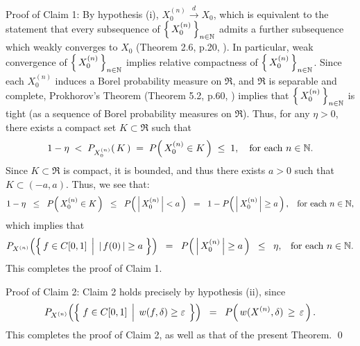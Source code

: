 \vskip 0.3cm
\noindent
Proof of Claim 1:\quad
By hypothesis (i), $X^{(n)}_{0} \overset{d}{\longrightarrow} X_{0}$, which is equivalent to
the statement that every subsequence of $\left\{\,X^{(n)}_{0}\,\right\}_{n\in\mathbb{N}}$ admits a further
subsequence which weakly converges to $X_{0}$ (Theorem 2.6, p.20, \cite{Billingsley1999}).
In particular, weak convergence of $\left\{\,X^{(n)}_{0}\,\right\}_{n\in\mathbb{N}}$ implies relative
compactness of $\left\{\,X^{(n)}_{0}\,\right\}_{n\in\mathbb{N}}$.
Since each $X^{(n)}_{0}$ induces a Borel probability measure on $\Re$, and $\Re$ is separable and complete,
Prokhorov's Theorem (Theorem 5.2, p.60, \cite{Billingsley1999}) implies that $\left\{\,X^{(n)}_{0}\,\right\}_{n\in\mathbb{N}}$
is tight (as a sequence of Borel probability measures on $\Re$).
Thus, for any $\eta > 0$, there exists a compact set $K \subset \Re$ such that
\begin{equation*}
1 - \eta \;<\; P_{X^{(n)}_{0}}\!\left(\,K\,\right) \;=\; P\!\left(\,X^{(n)}_{0} \in K\,\right) \;\leq\; 1,
\quad\textnormal{for each $n \in \mathbb{N}$}.
\end{equation*}
Since $K \subset \Re$ is compact, it is bounded, and thus there exists $a > 0$ such that
$K \subset (-a,a)$. Thus, we see that:
\begin{equation*}
1 - \eta
\;\;\leq\;\; P\!\left(\,X^{(n)}_{0} \in K\,\right)
\;\;\leq\;\; P\!\left(\, \left\vert\,X^{(n)}_{0}\,\right\vert \overset{{\color{white}.}}{<} a \,\right)
\;\; = \;\; 1 - P\!\left(\, \left\vert\,X^{(n)}_{0}\,\right\vert \overset{{\color{white}.}}{\geq} a \,\right),
\;\;\;\textnormal{for each $n \in \N$},
\end{equation*}
which implies that
\begin{equation*}
P_{X^{(n)}}\!\left(\left\{\,f \in \Czo \;\left\vert\;\, \vert\,f(0)\,\vert \overset{{\color{white}.}}{\geq} a \right.\,\right\}\right)
\;\; = \;\; P\!\left(\, \left\vert\,X^{(n)}_{0}\,\right\vert \overset{{\color{white}.}}{\geq} a \,\right)
\;\;\leq\;\; \eta,
\;\;\;\textnormal{for each $n \in \N$}.
\end{equation*}
This completes the proof of Claim 1.

\vskip 0.5cm
\noindent
Proof of Claim 2:\quad
Claim 2 holds precisely by hypothesis (ii), since
\begin{equation*}
	P_{X^{(n)}}\!\left(\left\{\;
		f \in \Czo
		\;\left\vert\;\,
		w(f,\delta) \overset{{\color{white}.}}{\geq} \varepsilon
		\right.
	\;\right\}\right)
	\;\; = \;\;
	P\!\left(\, w(X^{(n)},\delta) \,\geq\, \varepsilon \,\right).
\end{equation*}
This completes the proof of Claim 2, as well as that of the present Theorem.
\qed


